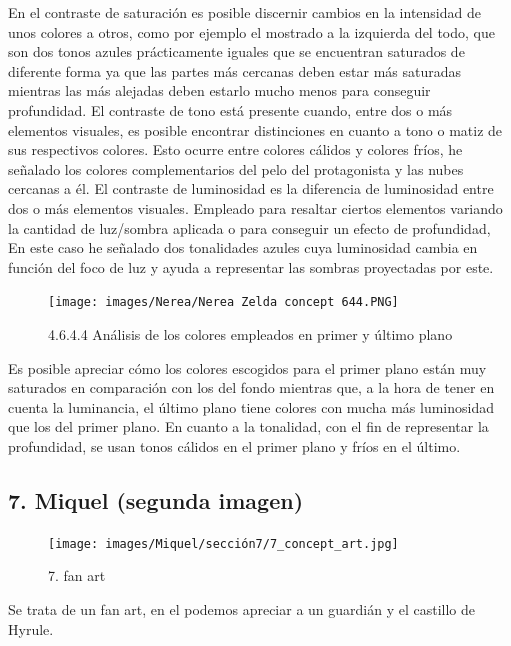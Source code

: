 \documentclass[12pt]{article}
\begin{document}
    En el contraste de saturación es posible discernir cambios en la intensidad de unos colores a otros, como por ejemplo el mostrado a la izquierda del todo, que son dos tonos azules prácticamente iguales que se encuentran saturados de diferente forma ya que las partes más cercanas deben estar más saturadas mientras las más alejadas deben estarlo mucho menos para conseguir profundidad. El contraste de tono está presente cuando, entre dos o más elementos visuales, es posible encontrar distinciones en cuanto a tono o matiz de sus respectivos colores. Esto ocurre entre colores cálidos y colores fríos, he señalado los colores complementarios del pelo del protagonista y las nubes cercanas a él. El contraste de luminosidad es la diferencia de luminosidad entre dos o más elementos visuales. Empleado para resaltar ciertos elementos variando la cantidad de luz/sombra aplicada o para conseguir un efecto de profundidad, En este caso he señalado dos tonalidades azules cuya luminosidad cambia en función del foco de luz y ayuda a representar las sombras proyectadas por este.

    \begin{figure}[H]
      \centering
      \texttt{[image: images/Nerea/Nerea Zelda concept 644.PNG]}
      \caption{\small 4.6.4.4 Análisis de los colores empleados en primer y último plano}
    \end{figure}

    Es posible apreciar cómo los colores escogidos para el primer plano están muy saturados en comparación con los del fondo mientras que, a la hora de tener en cuenta la luminancia, el último plano tiene colores con mucha más luminosidad que los del primer plano. En cuanto a la tonalidad, con el fin de representar la profundidad, se usan tonos cálidos en el primer plano y fríos en el último.
        \newpage


    \subsection{7. Miquel (segunda imagen)}
    \begin{figure}[H]
      \centering
      \texttt{[image: images/Miquel/sección7/7\_concept\_art.jpg]}
      \caption{\small 7. fan art}
    \end{figure}

    Se trata de un fan art, en el podemos apreciar a un guardián y el castillo de Hyrule.
\end{document}
